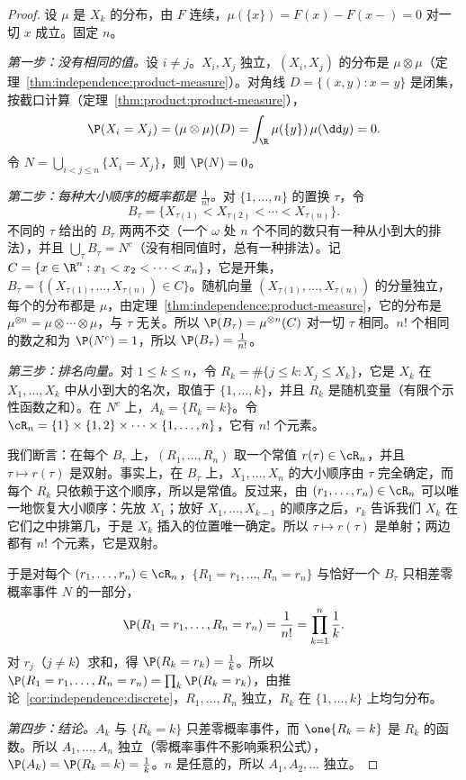\begin{proof}
设 $\mu$ 是 $X_k$ 的分布，由 $F$ 连续，$\mu(\{x\})=F(x)-F(x-)=0$ 对一切 $x$ 成立。固定 $n$。

\emph{第一步：没有相同的值。}设 $i\neq j$。$X_i,X_j$ 独立，$(X_i,X_j)$ 的分布是 $\mu\otimes\mu$（定理~\ref{thm:independence:product-measure}）。对角线 $D=\{(x,y):x=y\}$ 是闭集，按截口计算（定理~\ref{thm:product:product-measure}），
\[
\P(X_i=X_j)=(\mu\otimes\mu)(D)=\int_\R\mu(\{y\})\,\mu(\dd y)=0 .
\]
令 $N=\bigcup_{i<j\leqslant n}\{X_i=X_j\}$，则 $\P(N)=0$。

\emph{第二步：每种大小顺序的概率都是 $\frac1{n!}$。}对 $\{1,\dots,n\}$ 的置换 $\tau$，令
\[
B_\tau=\{X_{\tau(1)}<X_{\tau(2)}<\cdots<X_{\tau(n)}\}.
\]
不同的 $\tau$ 给出的 $B_\tau$ 两两不交（一个 $\omega$ 处 $n$ 个不同的数只有一种从小到大的排法），并且 $\bigcup_\tau B_\tau=N^c$（没有相同值时，总有一种排法）。记 $C=\{x\in\R^n:x_1<x_2<\cdots<x_n\}$，它是开集，$B_\tau=\{(X_{\tau(1)},\dots,X_{\tau(n)})\in C\}$。随机向量 $(X_{\tau(1)},\dots,X_{\tau(n)})$ 的分量独立，每个的分布都是 $\mu$，由定理~\ref{thm:independence:product-measure}，它的分布是 $\mu^{\otimes n}=\mu\otimes\cdots\otimes\mu$，与 $\tau$ 无关。所以 $\P(B_\tau)=\mu^{\otimes n}(C)$ 对一切 $\tau$ 相同。$n!$ 个相同的数之和为 $\P(N^c)=1$，所以 $\P(B_\tau)=\frac1{n!}$。

\emph{第三步：排名向量。}对 $1\leqslant k\leqslant n$，令 $R_k=\#\{j\leqslant k:X_j\leqslant X_k\}$，它是 $X_k$ 在 $X_1,\dots,X_k$ 中从小到大的名次，取值于 $\{1,\dots,k\}$，并且 $R_k$ 是随机变量（有限个示性函数之和）。在 $N^c$ 上，$A_k=\{R_k=k\}$。令 $\cR_n=\{1\}\times\{1,2\}\times\cdots\times\{1,\dots,n\}$，它有 $n!$ 个元素。

我们断言：在每个 $B_\tau$ 上，$(R_1,\dots,R_n)$ 取一个常值 $r(\tau)\in\cR_n$，并且 $\tau\mapsto r(\tau)$ 是双射。事实上，在 $B_\tau$ 上，$X_1,\dots,X_n$ 的大小顺序由 $\tau$ 完全确定，而每个 $R_k$ 只依赖于这个顺序，所以是常值。反过来，由 $(r_1,\dots,r_n)\in\cR_n$ 可以唯一地恢复大小顺序：先放 $X_1$；放好 $X_1,\dots,X_{k-1}$ 的顺序之后，$r_k$ 告诉我们 $X_k$ 在它们之中排第几，于是 $X_k$ 插入的位置唯一确定。所以 $\tau\mapsto r(\tau)$ 是单射；两边都有 $n!$ 个元素，它是双射。

于是对每个 $(r_1,\dots,r_n)\in\cR_n$，$\{R_1=r_1,\dots,R_n=r_n\}$ 与恰好一个 $B_\tau$ 只相差零概率事件 $N$ 的一部分，
\[
\P(R_1=r_1,\dots,R_n=r_n)=\frac1{n!}=\prod_{k=1}^n\frac1k .
\]
对 $r_j$（$j\neq k$）求和，得 $\P(R_k=r_k)=\frac1k$。所以 $\P(R_1=r_1,\dots,R_n=r_n)=\prod_k\P(R_k=r_k)$，由推论~\ref{cor:independence:discrete}，$R_1,\dots,R_n$ 独立，$R_k$ 在 $\{1,\dots,k\}$ 上均匀分布。

\emph{第四步：结论。}$A_k$ 与 $\{R_k=k\}$ 只差零概率事件，而 $\one\{R_k=k\}$ 是 $R_k$ 的函数。所以 $A_1,\dots,A_n$ 独立（零概率事件不影响乘积公式），$\P(A_k)=\P(R_k=k)=\frac1k$。$n$ 是任意的，所以 $A_1,A_2,\dots$ 独立。
\end{proof}

